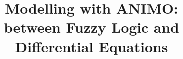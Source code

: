 \documentclass{bmcart}
\def\animo2{ANIMO 2}
\begin{document}
\begin{frontmatter}

\begin{fmbox}

\title{Modelling with ANIMO:\\ between Fuzzy Logic and Differential Equations}%


\author[
   addressref={aff1},                   %
   noteref={n1},                        %
   email={s.schivo@utwente.nl}   %
]{~}
\author[
   addressref={aff2},
   noteref={n1},
   email={j.scholma@utwente.nl}
]{~}
\author[
   addressref={aff3},
   email={p.e.vandervet@utwente.nl}
]{~}
\author[
   addressref={aff2},
   email={h.b.j.karperien@utwente.nl}
]{~}
\author[
   addressref={aff2},
   email={j.n.post@utwente.nl}
]{~}
\author[
   addressref={aff1},
   email={j.c.vandepol@utwente.nl}
]{~}
\author[
   addressref={aff1},
   corref={aff1},
   email={r.langerak@utwente.nl}
]{~}



\end{fmbox}
\end{frontmatter}
\end{document}
